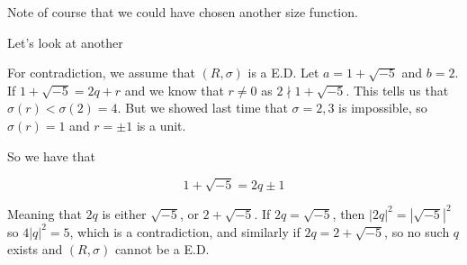 \documentclass[12pt]{article}
\begin{document}
Note of course that we could have chosen another size function.

Let's look at another


For contradiction, we assume that $(R, \sigma)$ is a E.D. Let $a = 1 +
\sqrt{-5}$ and $b = 2$. If $1 + \sqrt{-5} = 2q + r$ and we know that $r \ne 0$
as $2 \nmid 1 + \sqrt{-5}$. This tells us that $\sigma(r) < \sigma(2) = 4$. But
we showed last time that $\sigma = 2, 3$ is impossible, so $\sigma(r) = 1$ and
$r = \pm 1$ is a unit.

So we have that

\[
  1 + \sqrt{-5} = 2q \pm 1
\]

Meaning that $2q$ is either $\sqrt{-5}$, or $2 + \sqrt{-5}$. If $2q =
\sqrt{-5}$, then $|2q|^2 = |\sqrt{-5}|^2$ so $4 |q|^2 = 5$, which is a
contradiction, and similarly if $2q = 2 + \sqrt{-5}$, so no such $q$ exists and
$(R, \sigma)$ cannot be a E.D.
\end{document}
